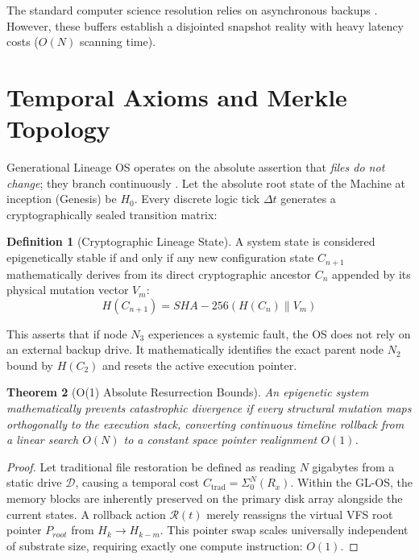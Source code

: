 \documentclass[12pt, a4paper]{article}
\theoremstyle{plain}
\newtheorem{theorem}{Theorem}[section]
\theoremstyle{definition}
\newtheorem{definition}[theorem]{Definition}
\begin{document}
The standard computer science resolution relies on asynchronous backups \cite{navarro2001syntactic}. However, these buffers establish a disjointed snapshot reality with heavy latency costs ($O(N)$ scanning time). 

\section{Temporal Axioms and Merkle Topology}
Generational Lineage OS operates on the absolute assertion that \textit{files do not change}; they branch continuously \cite{merkle1980protocols}.
Let the absolute root state of the Machine at inception (Genesis) be $H_0$. Every discrete logic tick $\Delta t$ generates a cryptographically sealed transition matrix: 

\begin{definition}[Cryptographic Lineage State]
A system state is considered epigenetically stable if and only if any new configuration state $C_{n+1}$ mathematically derives from its direct cryptographic ancestor $C_n$ appended by its physical mutation vector $V_m$:
\begin{equation}
    H(C_{n+1}) = SHA-256\left(H(C_n) \parallel V_m \right)
\end{equation}
\end{definition}

This asserts that if node $N_3$ experiences a systemic fault, the OS does not rely on an external backup drive. It mathematically identifies the exact parent node $N_2$ bound by $H(C_2)$ and resets the active execution pointer.

\begin{theorem} [O(1) Absolute Resurrection Bounds]
An epigenetic system mathematically prevents catastrophic divergence if every structural mutation maps orthogonally to the execution stack, converting continuous timeline rollback from a linear search $O(N)$ to a constant space pointer realignment $O(1)$.
\end{theorem}
\begin{proof}
Let traditional file restoration be defined as reading $N$ gigabytes from a static drive $\mathcal{D}$, causing a temporal cost $C_{\text{trad}} = \Sigma_0^N (R_x)$. 
Within the GL-OS, the memory blocks are inherently preserved on the primary disk array alongside the current states. A rollback action $\mathcal{R}(t)$ merely reassigns the virtual VFS root pointer $P_{root}$ from $H_k \to H_{k-m}$. This pointer swap scales universally independent of substrate size, requiring exactly one compute instruction: $O(1)$.
\end{proof}
\end{document}
